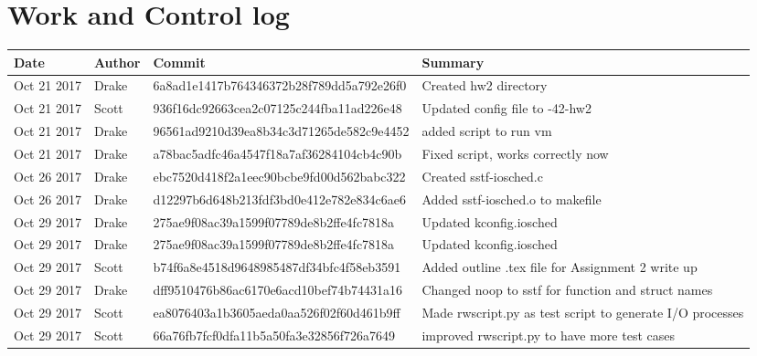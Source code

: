 \documentclass[letterpaper,10pt,notitlepage,fleqn]{article}
\begin{document}
\section{Work and Control log}
\begin{center}
    \begin{tabular}{| p{2.5cm} | l | l | p{3cm} |}    
    	\hline
        Date & Author & Commit & Summary \\ \hline
        Oct 21 2017 & Drake & 6a8ad1e1417b764346372b28f789dd5a792e26f0 & Created hw2 directory \\ \hline
        Oct 21 2017 & Scott & 936f16dc92663cea2c07125c244fba11ad226e48 & Updated config file to -42-hw2 \\ \hline
        Oct 21 2017 & Drake & 96561ad9210d39ea8b34c3d71265de582c9e4452 & added script to run vm \\ \hline
        Oct 21 2017 & Drake & a78bac5adfc46a4547f18a7af36284104cb4c90b & Fixed script, works correctly now \\ \hline
        Oct 26 2017 & Drake & ebc7520d418f2a1eec90bcbe9fd00d562babc322 & Created sstf-iosched.c \\ \hline
        Oct 26 2017 & Drake & d12297b6d648b213fdf3bd0e412e782e834c6ae6 & Added sstf-iosched.o to makefile \\ \hline
         Oct 29 2017 & Drake & 275ae9f08ac39a1599f07789de8b2ffe4fc7818a & Updated kconfig.iosched \\ \hline
         Oct 29 2017 & Drake & 275ae9f08ac39a1599f07789de8b2ffe4fc7818a & Updated kconfig.iosched \\ \hline
         Oct 29 2017 & Scott & b74f6a8e4518d9648985487df34bfc4f58eb3591 & Added outline .tex file for Assignment 2 write up \\ \hline
         Oct 29 2017 & Drake & dff9510476b86ac6170e6acd10bef74b74431a16 & Changed noop to sstf for function and struct names \\ \hline
         Oct 29 2017 & Scott & ea8076403a1b3605aeda0aa526f02f60d461b9ff & Made rwscript.py as test script to generate I/O processes \\ \hline
         Oct 29 2017 & Scott & 66a76fb7fcf0dfa11b5a50fa3e32856f726a7649 & improved rwscript.py to have more test cases \\ \hline
         
        
        
	
	\end{tabular}
\end{center}
\end{document}
